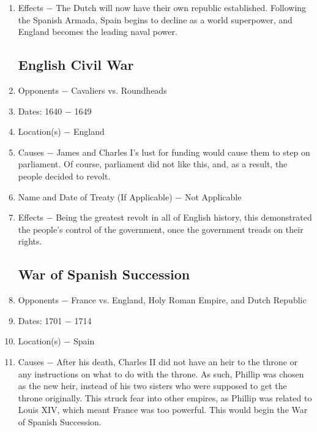 \documentclass[12pt]{article}
\begin{document}
\begin{enumerate}
\item Effects $-$ The Dutch will now have their own republic established. Following the Spanish Armada, Spain begins to decline as a world superpower, and England becomes the leading naval power.

\subsection{English Civil War}

\item Opponents $-$ Cavaliers vs. Roundheads

\item Dates: 1640 $-$ 1649

\item Location(s) $-$ England

\item Causes $-$ James and Charles I's lust for funding would cause them to step on parliament. Of course, parliament did not like this, and, as a result, the people decided to revolt.

\item Name and Date of Treaty (If Applicable) $-$ Not Applicable

\item Effects $-$ Being the greatest revolt in all of English history, this demonstrated the people's control of the government, once the government treads on their rights.

\subsection{War of Spanish Succession}
 
\item Opponents $-$ France vs. England, Holy Roman Empire, and Dutch Republic

\item Dates: 1701 $-$ 1714

\item Location(s) $-$ Spain

\item Causes $-$ After his death, Charles II did not have an heir to the throne or any instructions on what to do with the throne. As such, Phillip was chosen as the new heir, instead of his two sisters who were supposed to get the throne originally. This struck fear into other empires, as Phillip was related to Louis XIV, which meant France was too powerful. This would begin the War of Spanish Succession.


\end{enumerate}
\end{document}
